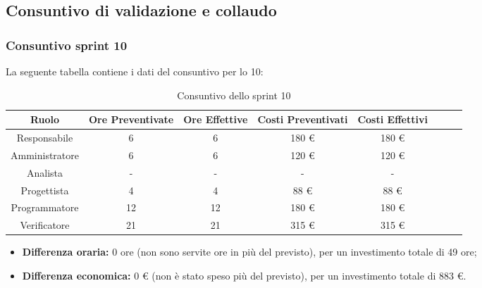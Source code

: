 \subsection{Consuntivo di validazione e collaudo}

\subsubsection{Consuntivo sprint 10}

La seguente tabella contiene i dati del consuntivo per lo  10:
\begin{table}[H]
		\begin{center}
			\setlength{\aboverulesep}{0pt}
			\setlength{\belowrulesep}{0pt}
			\setlength{\extrarowheight}{.75ex}
			\begin{tabular}{ c c c c c c c c }
				\rowcolor{AzzurroGruppo!30} 
				\textbf{Ruolo} & \textbf{Ore Preventivate} & \textbf{Ore Effettive} & \textbf{Costi Preventivati} & \textbf{Costi Effettivi}\\
				\toprule
				Responsabile   & 6 & 6 & 180 \euro{}  & 180 \euro{}\\
				Amministratore & 6 & 6 & 120 \euro{}  & 120 \euro{} \\
				Analista       & - & - & - & - \\
				Progettista    & 4 & 4 & 88 \euro{} & 88 \euro{} \\
				Programmatore  & 12 & 12 & 180 \euro{}  & 180 \euro{} \\
				Verificatore   & 21 & 21 & 315 \euro{}  & 315 \euro{} \\
				\bottomrule
			\end{tabular}
			\caption{Consuntivo dello sprint 10}
		\end{center}
	\end{table}
	
\begin{itemize}
	\item \textbf{Differenza oraria:} 0 ore (non sono servite ore in più del previsto), per un investimento totale di 49 ore;
	\item \textbf{Differenza economica:} 0 \euro{} (non è stato speso più del previsto), per un investimento totale di 883 \euro{}.
\end{itemize}